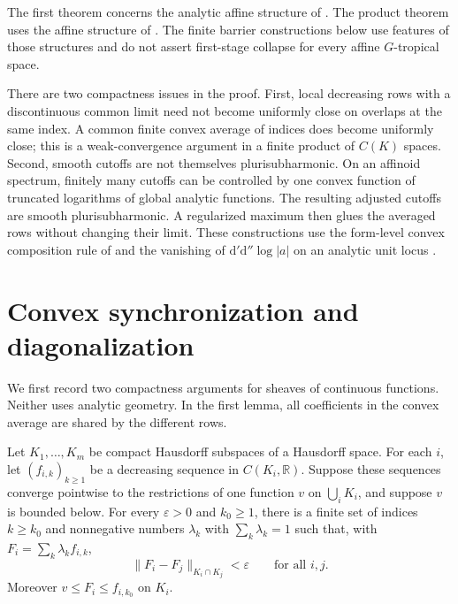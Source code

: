 \documentclass[11pt,a4paper]{amsart}
\begin{document}
The first theorem concerns the analytic affine structure of \cite[\S12.4.6]{CLD12}. The product theorem uses the affine structure of \cite[\S9.1]{CLD12}. The finite barrier constructions below use features of those structures and do not assert first-stage collapse for every affine $G$-tropical space.

There are two compactness issues in the proof. First, local decreasing rows with a discontinuous common limit need not become uniformly close on overlaps at the same index. A common finite convex average of indices does become uniformly close; this is a weak-convergence argument in a finite product of $C(K)$ spaces. Second, smooth cutoffs are not themselves plurisubharmonic. On an affinoid spectrum, finitely many cutoffs can be controlled by one convex function of truncated logarithms of global analytic functions. The resulting adjusted cutoffs are smooth plurisubharmonic. A regularized maximum then glues the averaged rows without changing their limit. These constructions use the form-level convex composition rule of \cite[Proposition~8.2.1]{CLD12} and the vanishing of $\mathrm{d}'\mathrm{d}''\log|a|$ on an analytic unit locus \cite[Lemma~16.7.4]{CLD12}.

\section{Convex synchronization and diagonalization}
\label{sec:synchronization}

We first record two compactness arguments for sheaves of continuous functions. Neither uses analytic geometry. In the first lemma, all coefficients in the convex average are shared by the different rows.

\begin{lemma}
\label{lem:convex-synchronization}
Let $K_1,\ldots,K_m$ be compact Hausdorff subspaces of a Hausdorff space. For each $i$, let $(f_{i,k})_{k\geq1}$ be a decreasing sequence in $C(K_i,\mathbb{R})$. Suppose these sequences converge pointwise to the restrictions of one function $v$ on $\bigcup_i K_i$, and suppose $v$ is bounded below. For every $\varepsilon>0$ and $k_0\geq1$, there is a finite set of indices $k\geq k_0$ and nonnegative numbers $\lambda_k$ with $\sum_k\lambda_k=1$ such that, with $F_i=\sum_k\lambda_k f_{i,k}$,
\[
\lVert F_i-F_j\rVert_{K_i\cap K_j}<\varepsilon
\qquad\text{for all }i,j.
\]
Moreover $v\leq F_i\leq f_{i,k_0}$ on $K_i$.
\end{lemma}
\end{document}
